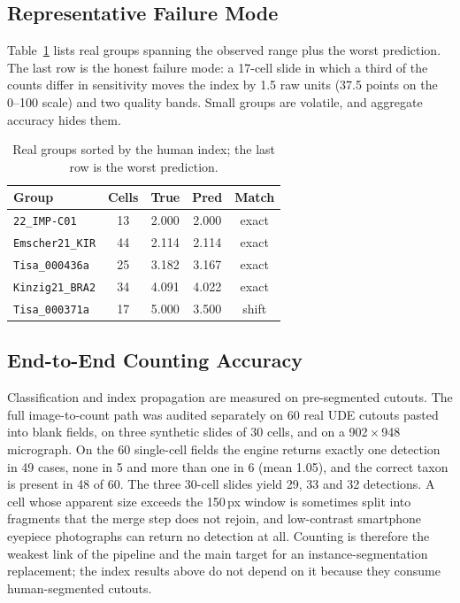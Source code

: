 \documentclass[10pt,twocolumn,a4paper]{article}
\begin{document}
\subsection{Representative Failure Mode}
Table~\ref{tab:worst} lists real groups spanning the observed range plus the worst prediction. The last row is the honest failure mode: a 17-cell slide in which a third of the counts differ in sensitivity moves the index by 1.5 raw units (37.5 points on the 0--100 scale) and two quality bands. Small groups are volatile, and aggregate accuracy hides them.

\begin{table}[h]
\centering
\small
\caption{Real groups sorted by the human index; the last row is the worst prediction.}
\label{tab:worst}
\begin{tabular}{lcccc}
\toprule
\textbf{Group} & \textbf{Cells} & \textbf{True} & \textbf{Pred} & \textbf{Match} \\
\midrule
\texttt{22\_IMP-C01}      & 13 & 2.000 & 2.000 & exact \\
\texttt{Emscher21\_KIR}   & 44 & 2.114 & 2.114 & exact \\
\texttt{Tisa\_000436a}    & 25 & 3.182 & 3.167 & exact \\
\texttt{Kinzig21\_BRA2}   & 34 & 4.091 & 4.022 & exact \\
\texttt{Tisa\_000371a}    & 17 & 5.000 & 3.500 & shift \\
\bottomrule
\end{tabular}
\end{table}

\subsection{End-to-End Counting Accuracy}
Classification and index propagation are measured on pre-segmented cutouts. The full image-to-count path was audited separately on 60 real UDE cutouts pasted into blank fields, on three synthetic slides of 30 cells, and on a 902\,$\times$\,948 micrograph. On the 60 single-cell fields the engine returns exactly one detection in 49 cases, none in 5 and more than one in 6 (mean 1.05), and the correct taxon is present in 48 of 60. The three 30-cell slides yield 29, 33 and 32 detections. A cell whose apparent size exceeds the 150\,px window is sometimes split into fragments that the merge step does not rejoin, and low-contrast smartphone eyepiece photographs can return no detection at all. Counting is therefore the weakest link of the pipeline and the main target for an instance-segmentation replacement; the index results above do not depend on it because they consume human-segmented cutouts.
\end{document}
